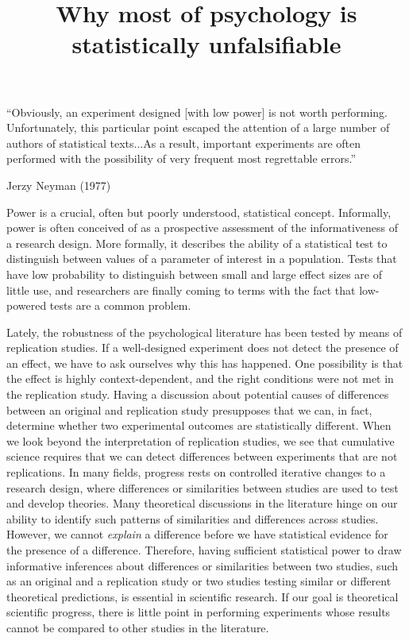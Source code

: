 \documentclass[doc,a4paper,floatsintext,draftfirst]{apa6}
\title{Why most of psychology is statistically unfalsifiable}
\begin{document}
\maketitle

\setlength{\epigraphwidth}{\columnwidth}
\epigraph{``Obviously, an experiment designed [with low power] is not worth performing. Unfortunately, this particular point escaped the attention of a large number of authors of statistical texts...As a result, important experiments are often performed with the possibility of very frequent most regrettable errors.''}{\par\raggedleft\textup{Jerzy Neyman} (1977)}

\nocite{Neyman:1977}

Power is a crucial, often but poorly understood, statistical concept. Informally, power is often conceived of as a prospective assessment of the informativeness of a research design. More formally, it describes the ability of a statistical test to distinguish between values of a parameter of interest in a population. Tests that have low probability to distinguish between small and large effect sizes are of little use, and researchers are finally coming to terms with the fact that low-powered tests are a common problem. 

Lately, the robustness of the psychological literature has been tested by means of replication studies. If a well-designed experiment does not detect the presence of an effect, we have to ask ourselves why this has happened. One possibility is that the effect is highly context-dependent, and the right conditions were not met in the replication study. Having a discussion about potential causes of differences between an original and replication study presupposes that we can, in fact, determine whether two experimental outcomes are statistically different. When we look beyond the interpretation of replication studies, we see that cumulative science requires that we can detect differences between experiments that are not replications. In many fields, progress rests on controlled iterative changes to a research design, where differences or similarities between studies are used to test and develop theories. Many theoretical discussions in the literature hinge on our ability to identify such patterns of similarities and differences across studies. However, we cannot {\em explain} a difference before we have statistical evidence for the presence of a difference. Therefore, having sufficient statistical power to draw informative inferences about differences or similarities between two studies, such as an original and a replication study or two studies testing similar or different theoretical predictions, is essential in scientific research. If our goal is theoretical scientific progress, there is little point in performing experiments whose results cannot be compared to other studies in the literature.
\end{document}
